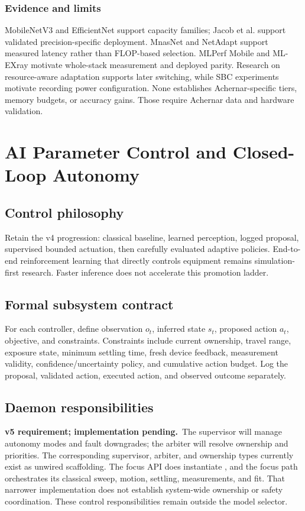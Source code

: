 \documentclass[11pt,a4paper]{article}
\newcommand{\code}[1]{\texttt{\detokenize{#1}}}
\newcommand{\planned}{\textbf{v5 requirement; implementation pending.}\ }
\begin{document}
\subsubsection{Evidence and limits}
MobileNetV3 and EfficientNet support capacity families; Jacob et al. support
validated precision-specific deployment\cite{mobilenet,efficientnet,jacob}.
MnasNet and NetAdapt support measured latency rather than FLOP-based
selection\cite{mnasnet,netadapt}. MLPerf Mobile and ML-EXray motivate whole-stack
measurement and deployed parity\cite{mlperfmobile,mlexray}. Research on
resource-aware adaptation supports later switching\cite{nestdnn,approxdet},
while SBC experiments motivate recording power configuration\cite{sbc}.
None establishes Achernar-specific tiers, memory budgets, or accuracy gains.
Those require Achernar data and hardware validation.

\section{AI Parameter Control and Closed-Loop Autonomy}
\subsection{Control philosophy}
Retain the v4 progression: classical baseline, learned perception, logged
proposal, supervised bounded actuation, then carefully evaluated adaptive
policies. End-to-end reinforcement learning that directly controls equipment
remains simulation-first research. Faster inference does not accelerate this
promotion ladder.

\subsection{Formal subsystem contract}
For each controller, define observation $o_t$, inferred state $s_t$, proposed
action $a_t$, objective, and constraints. Constraints include current ownership,
travel range, exposure state, minimum settling time, fresh device feedback,
measurement validity, confidence/uncertainty policy, and cumulative action
budget. Log the proposal, validated action, executed action, and observed
outcome separately.

\subsection{Daemon responsibilities}
\planned The supervisor will manage autonomy modes and fault downgrades;
the arbiter will resolve ownership and priorities. The corresponding supervisor,
arbiter, and ownership types currently exist as unwired scaffolding. The focus
API does instantiate \code{FocusSafetyGuard}, and the focus path orchestrates
its classical sweep, motion, settling, measurements, and fit. That narrower
implementation does not establish system-wide ownership or safety coordination.
These control responsibilities remain outside the model selector.
\end{document}
